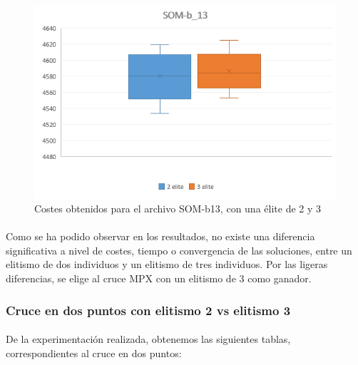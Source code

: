 	\begin{figure}[H]
		\centering
		\includegraphics[scale=0.7]{img/MPX_2vs3/SOM-b_13_Costes}
		\caption{Costes obtenidos para el archivo SOM-b13, con una élite de 2 y 3}
		\label{som-b13_coste}
		
		
	\end{figure}


	\paragraph{}Como se ha podido observar en los resultados, no existe una diferencia significativa a nivel de costes, tiempo o convergencia de las soluciones, entre un elitismo de dos individuos y un elitismo de tres individuos. Por las ligeras diferencias, se elige al cruce MPX con un elitismo de 3 como ganador.

	\subsubsection{Cruce en dos puntos con elitismo 2 vs elitismo 3}
	
	\paragraph{}De la experimentación realizada, obtenemos las siguientes tablas, correspondientes al cruce en dos puntos:
	

